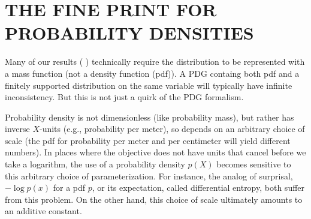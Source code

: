 \documentclass[twoside]{article}
\newif\ifappendix
\theoremstyle{plain}
\newtheorem{remark}{Remark}
\theoremstyle{definition}
\begin{document}
% 
% 
{
\printbibliography[heading=none]
}

\clearpage
\onecolumn
\appendix

\ifappendix
\section{THE FINE PRINT FOR PROBABILITY DENSITIES}
\label{appendix:density}
Many of our results (%
)
technically require the distribution to be represented with a mass function (not a density function (pdf)).
A PDG containg both pdf and a finitely supported distribution on the same variable
will typically have infinite inconsistency.
But this is not just a quirk of the PDG formalism.


Probability density is not dimensionless (like probability mass), but rather has inverse $X$-units (e.g., probability per meter), so depends on an arbitrary choice of scale (the pdf for probability per meter and per centimeter will yield different numbers).
In places where the objective does not have units that cancel before we take a logarithm,
the use of a probability density $p(X)$ becomes sensitive to this arbitrary choice of parameterization. For instance, the analog of surprisal, $- \log p(x)$ for a pdf $p$, or its expectation, called differential entropy, both suffer from this problem.
%
On the other hand, this choice of scale ultimately amounts to an additive constant.
\end{document}
